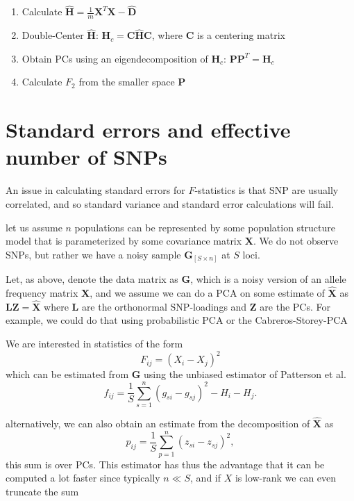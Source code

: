 \documentclass[12pt, letterpaper]{article}
\newcommand{\MX}{\mathbf{X}}
\newcommand{\MP}{\mathbf{P}}
\newcommand{\MG}{\mathbf{G}}
\newcommand{\MZ}{\mathbf{Z}}
\newcommand{\ML}{\mathbf{L}}
\begin{document}
\begin{enumerate}
    \item Calculate $\hat{\mathbf{H}} = \frac{1}{m}\mathbf{X}^T\mathbf{X} - \hat{\mathbf{D}}$
    \item Double-Center $\hat{\mathbf{H}}$: $\mathbf{H}_c = \mathbf{C}\hat{\mathbf{H}}\mathbf{C}$, where $\mathbf{C}$ is a centering matrix
    \item Obtain PCs using an eigendecomposition of $\mathbf{H}_c$: $\MP\MP^T = \mathbf{H}_c$
    \item Calculate $F_2$ from the smaller space $\MP$
\end{enumerate}

\section{Standard errors and effective number of SNPs}
An issue in calculating standard errors for $F$-statistics is that SNP are usually correlated, and so standard variance and standard error calculations will fail.

let us assume $n$ populations can be represented by some population structure model that is parameterized by some covariance matrix $\MX$. We do not observe SNPs, but rather we have a noisy sample $\MG_{[S \times n]}$ at $S$ loci.

Let, as above, denote the data matrix as $\MG$, which is a noisy version of an allele frequency matrix $\MX$, and we assume we can do a PCA on some estimate of $\hat{\MX}$ as 
$\ML\MZ = \hat{\MX}$ where $\ML$ are the orthonormal SNP-loadings and $\MZ$ are the PCs. For example, we could do that using probabilistic PCA or the Cabreros-Storey-PCA

We are interested in statistics of the form 
\begin{equation}
    F_{ij} = (X_i - X_j)^2
\end{equation}
which can be estimated from $\MG$ using the unbiased estimator of Patterson et al.
\begin{equation}
    f_{ij} = \frac{1}{S}\sum_{s=1}^n (g_{si} - g_{sj})^2 - H_i - H_j.
\end{equation}

alternatively, we can also obtain an estimate from the decomposition of  $\hat{\MX}$ as
\begin{equation}
    p_{ij} = \frac{1}{S}\sum_{p=1}^n (z_{si} - z_{sj})^2,
\end{equation}
this sum is over PCs. This estimator has thus the advantage that it can be computed a lot faster since typically $n \ll S$, and if $X$ is low-rank we can even truncate the sum
\end{document}
